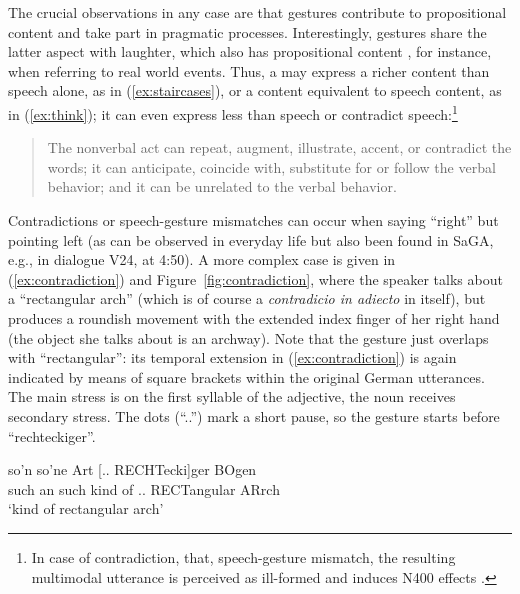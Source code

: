 \documentclass[output=paper]{langsci/langscibook}
\begin{document}
The crucial observations in any case are that gestures contribute to propositional content and take part in pragmatic processes.
%
Interestingly, gestures share the latter aspect with laughter, which also has propositional content \citep{Ginzburg:Breitholz:Cooper:Hough:Tian:2015}, for instance, when referring to real world events.
%
Thus, a  may express a richer content than speech alone, as in (\ref{ex:staircases}), or a content equivalent to speech content, as in (\ref{ex:think}); it can even express less than speech or contradict speech:\footnote{In case of contradiction, that, speech-gesture mismatch, the resulting multimodal utterance is perceived as ill-formed and induces N400 effects \citep{Wu:Coulson:2005,Kelly:Kravitz:Hopkins:2004}.} 
%
\begin{quote}
The nonverbal act can repeat, augment, illustrate, accent, or contradict the words; it can anticipate, coincide with, substitute for or follow the verbal behavior; and it can be unrelated to the verbal behavior.\hfill 
\citep[53]{Ekman:Friesen:1969}
\end{quote}

Contradictions or speech-gesture mismatches can occur when saying \enquote{right} but pointing left (as can be observed in everyday life but also been found in SaGA, e.g., in dialogue V24, at 4:50).
%
A more complex case is given in (\ref{ex:contradiction}) and Figure~\ref{fig:contradiction}, where the speaker talks about a \enquote{rectangular arch} (which is of course a \textit{contradicio in adiecto} in itself), but produces a roundish movement with the extended index finger of her right hand (the object she talks about is an archway).
%
Note that the gesture just overlaps with \enquote{rectangular}: its temporal extension in (\ref{ex:contradiction}) is again indicated by means of square brackets within the original German utterances. 
%
The main stress is on the first syllable of the adjective, the noun receives secondary stress.
%
The dots (\enquote{..}) mark a short pause, so the gesture starts before \enquote{rechteckiger}.

\ea \label{ex:contradiction}
\gll 
 so'n so'ne Art {[.. RECHTecki]ger} BOgen \\
{such an} such {kind of} {.. RECTangular} ARrch \\
\glt 
\enquote*{kind of rectangular arch}
\z
\end{document}
